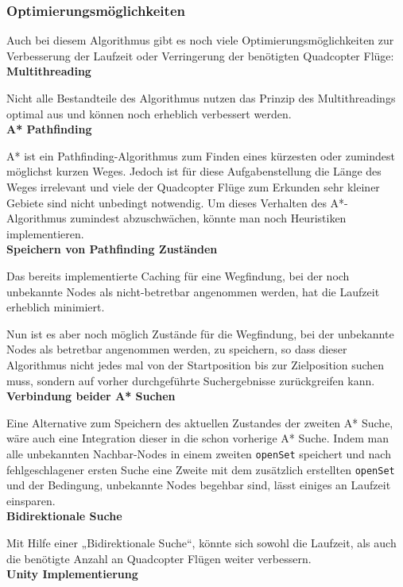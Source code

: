 \documentclass[a4paper,12pt]{article}
\newcommand{\code}{\texttt}
\begin{document}
\subsubsection{Optimierungsmöglichkeiten}
Auch bei diesem Algorithmus gibt es noch viele Optimierungsmöglichkeiten zur Verbesserung der Laufzeit oder Verringerung der benötigten Quadcopter Flüge:
\\[0.4cm]
\textbf{Multithreading}

Nicht alle Bestandteile des Algorithmus nutzen das Prinzip des Multithreadings optimal aus und können noch erheblich verbessert werden.
\\[0.4cm]
\textbf{A* Pathfinding}

A* ist ein Pathfinding-Algorithmus zum Finden eines kürzesten oder zumindest möglichst kurzen Weges. Jedoch ist für diese Aufgabenstellung die Länge des Weges irrelevant und viele der Quadcopter Flüge zum Erkunden sehr kleiner Gebiete sind nicht unbedingt notwendig. Um dieses Verhalten des A*-Algorithmus zumindest abzuschwächen, könnte man noch Heuristiken implementieren.
\\[0.4cm]
\textbf{Speichern von Pathfinding Zuständen}

Das bereits implementierte Caching für eine Wegfindung, bei der noch unbekannte Nodes als nicht-betretbar angenommen werden, hat die Laufzeit erheblich minimiert.

Nun ist es aber noch möglich Zustände für die Wegfindung, bei der unbekannte Nodes als betretbar angenommen werden, zu speichern, so dass dieser Algorithmus nicht jedes mal von der Startposition bis zur Zielposition suchen muss, sondern auf vorher durchgeführte Suchergebnisse zurückgreifen kann.
\\[0.4cm]
\textbf{Verbindung beider A* Suchen}

Eine Alternative zum Speichern des aktuellen Zustandes der zweiten A* Suche, wäre auch eine Integration dieser in die schon vorherige A* Suche. Indem man alle unbekannten Nachbar-Nodes in einem zweiten \code{openSet} speichert und nach fehlgeschlagener ersten Suche eine Zweite mit dem zusätzlich erstellten \code{openSet} und der Bedingung, unbekannte Nodes begehbar sind, lässt einiges an Laufzeit einsparen.
\\[0.4cm]
\textbf{Bidirektionale Suche}

Mit Hilfe einer „Bidirektionale Suche“, könnte sich sowohl die Laufzeit, als auch die benötigte Anzahl an Quadcopter Flügen weiter verbessern.
\\[0.4cm]
\textbf{Unity Implementierung}
\end{document}
